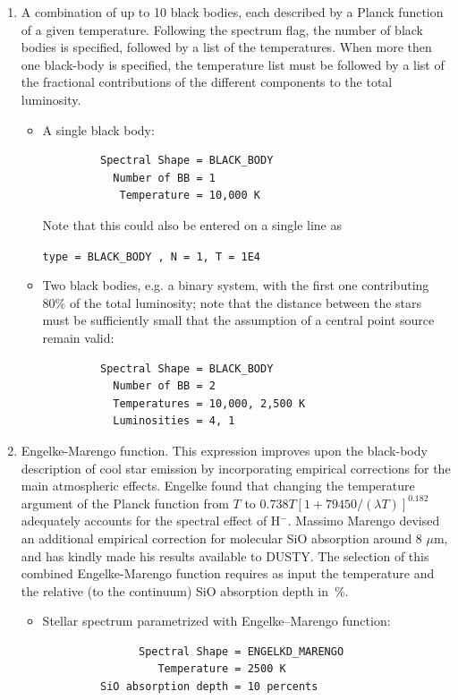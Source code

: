 \documentclass[11pt]{article}
\def\mic    {\hbox{$\mu$m}}
\begin{document}
\begin{enumerate}
%
\item A combination of up to 10 black bodies, each described by a Planck
    function of a given temperature. Following the spectrum flag, the
    number of black bodies is specified, followed by a list of the
    temperatures.  When more then one black-body is specified, the
    temperature list must be followed by a list of the fractional
    contributions of the different components to the total luminosity.
%
\begin{itemize}
%
\item A single black body:
\begin{verbatim}
         Spectral Shape = BLACK_BODY
           Number of BB = 1
            Temperature = 10,000 K
\end{verbatim}

Note that this could also be entered on a single line as

\hskip 1in {\tt type = BLACK\_BODY , N = 1, T = 1E4}

\item Two black bodies, e.g. a binary system, with the first one
    contributing 80\% of the total luminosity; note that the distance
    between the stars must be sufficiently small that the assumption of
    a central point source remain valid:
\begin{verbatim}
         Spectral Shape = BLACK_BODY
           Number of BB = 2
           Temperatures = 10,000, 2,500 K
           Luminosities = 4, 1
\end{verbatim}

\end{itemize}

\item Engelke-Marengo function.  This expression improves upon the
    black-body description of cool star emission by incorporating empirical
    corrections for the main atmospheric effects. Engelke \cite{Engelk}
    found that changing the temperature argument of the Planck function
    from $T$ to $0.738T[1 + 79450/(\lambda T)]^{0.182}$ adequately accounts
    for the spectral effect of H$^-$. Massimo Marengo \cite{Mareng} devised
    an additional empirical correction for molecular SiO absorption around
    8 \mic, and has kindly made his results available to DUSTY. The
    selection of this combined Engelke-Marengo function requires as input
    the temperature and the relative (to the continuum) SiO absorption
    depth in~\%.

\begin{itemize}
\item Stellar spectrum parametrized with Engelke--Marengo function:
\begin{verbatim}
               Spectral Shape = ENGELKD_MARENGO
                  Temperature = 2500 K
         SiO absorption depth = 10 percents
\end{verbatim}
\end{itemize}


\end{enumerate}
\end{document}
